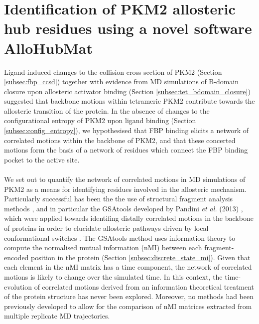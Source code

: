 \section{Identification of PKM2 allosteric hub residues using a novel software AlloHubMat}
\label{sec:allohubmat_dev}
Ligand-induced changes to the collision cross section of PKM2 (Section \ref{subsec:fbp_ccsd}) together with evidence from MD simulations of B-domain closure upon allosteric activator binding (Section \ref{subsec:tet_bdomain_closure}) suggested that backbone motions within tetrameric PKM2 contribute towards the allosteric transition of the protein. In the absence of changes to the configurational entropy of PKM2 upon ligand binding (Section \ref{subsec:config_entropy}), we hypothesised that FBP binding elicits a network of correlated motions within the backbone of PKM2, and that these concerted motions form the basis of a network of residues which connect the FBP binding pocket to the active site.
%
%
\\\\
%
%
We set out to quantify the network of correlated motions in MD simulations of PKM2 as a means for identifying residues involved in the allosteric mechanism. Particularly successful has been the the use of structural fragment analysis methods \cite{Craveur:2015aa}, and in particular the GSAtools developed by Pandini \textit{et al.} (2013) \cite{Pandini:2013aa}, which were applied towards identifing distally correlated motions in the backbone of proteins in order to elucidate allosteric pathways driven by local conformational switches \cite{Pandini:2012aa,Motta:2018aa,Pandini:2010aa,Pandini:2016aa}. The GSAtools method uses information theory to compute the normalised mutual information (nMI) between each fragment-encoded position in the protein (Section \ref{subsec:discrete_state_mi}). Given that each element in the nMI matrix has a time component, the network of correlated motions is likely to change over the simulated time. In this context, the time-evolution of correlated motions derived from an information theoretical treatment of the protein structure has never been explored. Moreover, no methods had been previously developed to allow for the comparison of nMI matrices extracted from multiple replicate MD trajectories.
%
%
\\\\
%
%
